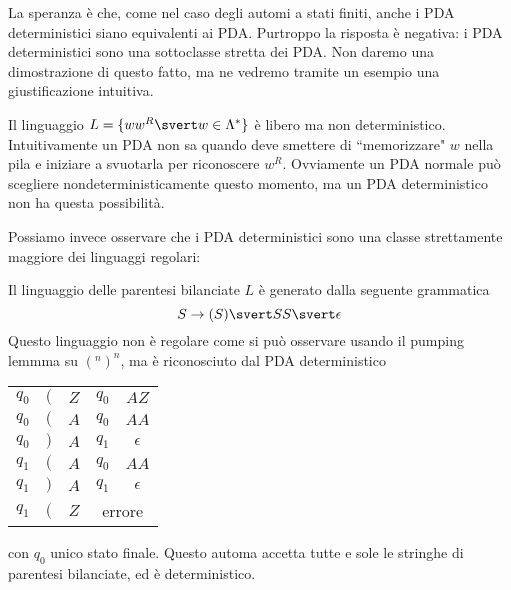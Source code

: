 \documentclass[12pt]{article}
\numberwithin{theorem}{subsection}
\begin{document}
La speranza è che, come nel caso degli automi a stati finiti, anche i PDA deterministici siano equivalenti ai PDA. Purtroppo la risposta è negativa: i PDA deterministici sono una sottoclasse stretta dei PDA. Non daremo una dimostrazione di questo fatto, ma ne vedremo tramite un esempio una giustificazione intuitiva.

\begin{example}
	Il linguaggio $L = \lbrace ww^R \svert w \in \Lambda^* \rbrace$ è libero ma non deterministico. Intuitivamente un PDA non sa quando deve smettere di ``memorizzare" $w$ nella pila e iniziare a svuotarla per riconoscere $w^R$. Ovviamente un PDA normale può scegliere nondeterministicamente questo momento, ma un PDA deterministico non ha questa possibilità.
\end{example}

Possiamo invece osservare che i PDA deterministici sono una classe strettamente maggiore dei linguaggi regolari:
\begin{example}
	Il linguaggio delle parentesi bilanciate $L$ è generato dalla seguente grammatica
	\[
	S \rightarrow (S) \svert SS \svert \epsilon
	\]
	Questo linguaggio non è regolare come si può osservare usando il pumping lemmma su $(^n)^n$, ma è riconosciuto dal PDA deterministico
	
	\vspace{0.2cm}
	\begin{tabular}{ *{3}{c} | *{2}{c} }
		$q_0$ & $($ & $Z$ & $q_0$ & $AZ$ \\
		$q_0$ & $($ & $A$ & $q_0$ & $AA$ \\
		$q_0$ & $)$ & $A$ & $q_1$ & $\epsilon$ \\
		$q_1$ & $($ & $A$ & $q_0$ & $AA$ \\
		$q_1$ & $)$ & $A$ & $q_1$ & $\epsilon$ \\
		\hline
		$q_1$ & $($ & $Z$ & \multicolumn{2}{c}{errore}
	\end{tabular}
	\vspace{0.2cm}


	con $q_0$ unico stato finale. Questo automa accetta tutte e sole le stringhe di parentesi bilanciate, ed è deterministico.
\end{example}
\end{document}
